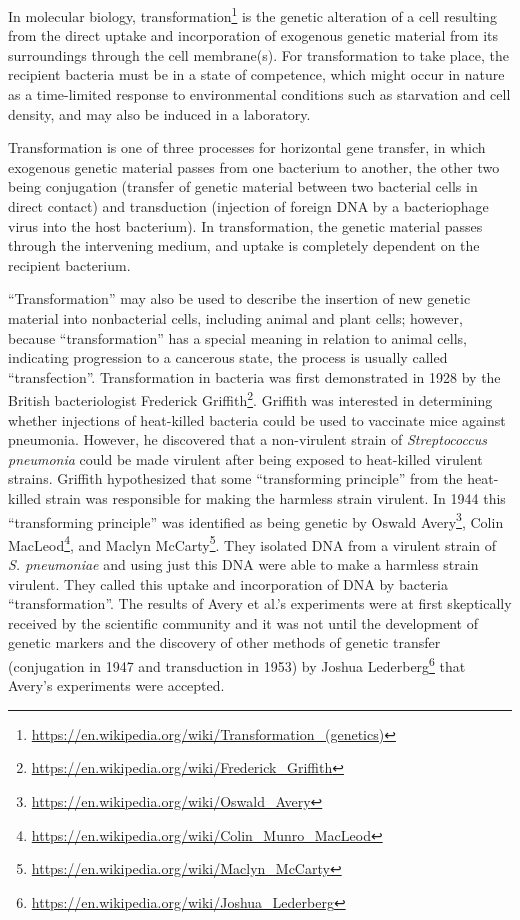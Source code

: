 \documentclass[]{book}
\let\rmarkdownfootnote\footnote%
\def\footnote{\protect\rmarkdownfootnote}
\renewcommand{\href}[2]{#2\footnote{\url{#1}}}
\begin{document}
In molecular biology,
\href{https://en.wikipedia.org/wiki/Transformation_(genetics)}{transformation}
is the genetic alteration of a cell resulting from the direct uptake and
incorporation of exogenous genetic material from its surroundings
through the cell membrane(s). For transformation to take place, the
recipient bacteria must be in a state of competence, which might occur
in nature as a time-limited response to environmental conditions such as
starvation and cell density, and may also be induced in a laboratory.

Transformation is one of three processes for horizontal gene transfer,
in which exogenous genetic material passes from one bacterium to
another, the other two being conjugation (transfer of genetic material
between two bacterial cells in direct contact) and transduction
(injection of foreign DNA by a bacteriophage virus into the host
bacterium). In transformation, the genetic material passes through the
intervening medium, and uptake is completely dependent on the recipient
bacterium.

``Transformation'' may also be used to describe the insertion of new
genetic material into nonbacterial cells, including animal and plant
cells; however, because ``transformation'' has a special meaning in
relation to animal cells, indicating progression to a cancerous state,
the process is usually called ``transfection''. Transformation in
bacteria was first demonstrated in 1928 by the British bacteriologist
\href{https://en.wikipedia.org/wiki/Frederick_Griffith}{Frederick
Griffith}. Griffith was interested in determining whether injections of
heat-killed bacteria could be used to vaccinate mice against pneumonia.
However, he discovered that a non-virulent strain of \emph{Streptococcus
pneumonia} could be made virulent after being exposed to heat-killed
virulent strains. Griffith hypothesized that some ``transforming
principle'' from the heat-killed strain was responsible for making the
harmless strain virulent. In 1944 this ``transforming principle'' was
identified as being genetic by
\href{https://en.wikipedia.org/wiki/Oswald_Avery}{Oswald Avery},
\href{https://en.wikipedia.org/wiki/Colin_Munro_MacLeod}{Colin MacLeod},
and \href{https://en.wikipedia.org/wiki/Maclyn_McCarty}{Maclyn McCarty}.
They isolated DNA from a virulent strain of \emph{S. pneumoniae} and
using just this DNA were able to make a harmless strain virulent. They
called this uptake and incorporation of DNA by bacteria
``transformation''. The results of Avery et al.'s experiments were at
first skeptically received by the scientific community and it was not
until the development of genetic markers and the discovery of other
methods of genetic transfer (conjugation in 1947 and transduction in
1953) by \href{https://en.wikipedia.org/wiki/Joshua_Lederberg}{Joshua
Lederberg} that Avery's experiments were accepted.
\end{document}

